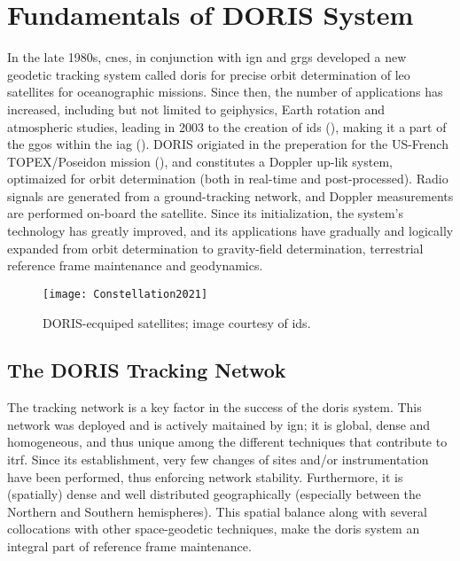\section{Fundamentals of DORIS System}\label{sec:doris-introduction}

In the late 1980s, \gls{cnes}, in conjunction with \gls{ign} and \gls{grgs} developed 
a new geodetic tracking system called \gls{doris} for precise orbit determination 
of \gls{leo} satellites for oceanographic missions. Since then, the number of 
applications has increased, including but not limited to geiphysics, Earth rotation 
and atmospheric studies, leading in 2003 to the creation of \gls{ids} (\cite{Willis2016}), making it a part 
of the \gls{ggos} within the \gls{iag} (\cite{Willis2006}). DORIS origiated in the
preperation for the US-French TOPEX/Poseidon mission (\cite{Fu1994}), and constitutes a 
Doppler up-lik system, optimaized for orbit determination (both in real-time and 
post-processed). Radio signals are generated from a ground-tracking network, and 
Doppler measurements are performed on-board the satellite. Since its initialization, 
the system's technology has greatly improved, and its applications have gradually 
and logically expanded from orbit determination to gravity-field determination, 
terrestrial reference frame maintenance and geodynamics.

\begin{figure}
  \centering
  \texttt{[image: Constellation2021]}
  \caption{DORIS-ecquiped satellites; image courtesy of \gls{ids}.}
  \label{fig:doris-constellations}
\end{figure}

\subsection{The DORIS Tracking Netwok}\label{ssec:doris-tracking-network}
The tracking network is a key factor in the success of the \gls{doris} system. 
This network was deployed and is actively maitained by \gls{ign}; it is global, dense 
and homogeneous, and thus unique among the different techniques that contribute to 
\gls{itrf}. Since its establishment, very few changes of sites and/or instrumentation 
have been performed, thus enforcing network stability. Furthermore, it is (spatially) 
dense and well distributed geographically (especially between the Northern and  
Southern hemispheres). This spatial balance along with several collocations with 
other space-geodetic techniques, make the \gls{doris} system an integral part of 
reference frame maintenance.

